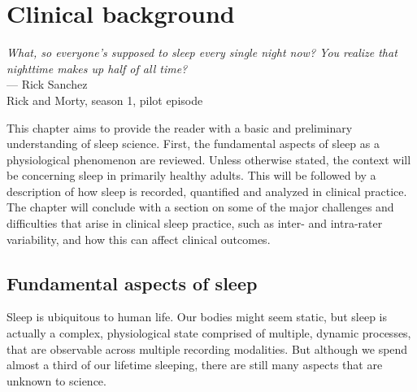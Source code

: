 \chapter{Clinical background}\label{chap:clinical-background}
\begin{flushright}{\slshape 
        What, so everyone’s supposed to sleep every single night now? You realize that nighttime makes up half of all time?} \\ \medskip
        --- Rick Sanchez\\Rick and Morty, season 1, pilot episode
\end{flushright}
\vspace{6cm}
    
    This chapter aims to provide the reader with a basic and preliminary understanding of sleep science. 
    First, the fundamental aspects of sleep as a physiological phenomenon are reviewed. Unless otherwise stated, the context will be concerning sleep in primarily healthy adults. 
    This will be followed by a description of how sleep is recorded, quantified and analyzed in clinical practice.
    The chapter will conclude with a section on some of the major challenges and difficulties that arise in clinical sleep practice, such as inter- and intra-rater variability, and how this can affect clinical outcomes.
    
    \section{Fundamental aspects of sleep}\label{sec:fundamental-aspects-sleep}
    
        Sleep is ubiquitous to human life. 
        Our bodies might seem static, but sleep is actually a complex, physiological state comprised of multiple, dynamic processes, that are observable across multiple recording modalities. 
        But although we spend almost a third of our lifetime sleeping, there are still many aspects that are unknown to science. 
       

